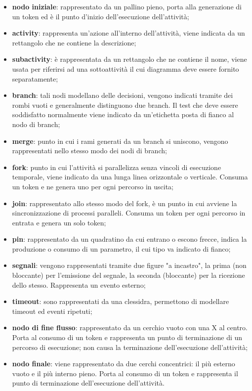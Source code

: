     	\begin{itemize}
    		\item{\textbf{nodo iniziale}}: rappresentato da un pallino pieno, porta alla generazione di un token ed è il punto d'inizio dell'esecuzione dell'attività;
    		\item{\textbf{activity}}: rappresenta un'azione all'interno dell'attività, viene indicata  da un rettangolo che ne contiene la descrizione;
    		\item{\textbf{subactivity}}: è rappresentata da un rettangolo che ne contiene il nome, viene usata per riferirsi ad una sottoattività il cui diagramma deve essere fornito separatamente;
    		\item{\textbf{branch}}: tali nodi modellano delle decisioni, vengono indicati tramite dei rombi vuoti e generalmente distinguono due branch. Il test che deve essere soddisfatto normalmente viene indicato da un'etichetta posta di fianco al nodo di branch;
    		\item{\textbf{merge}}: punto in cui i rami generati da un branch si uniscono, vengono rappresentati nello stesso modo dei nodi di branch;
    		\item{\textbf{fork}}: punto in cui l'attività si parallelizza senza vincoli di esecuzione temporale, viene indicato da una lunga linea orizzontale o verticale. Consuma un token e ne genera uno per ogni percorso in uscita;
    		\item{\textbf{join}}: rappresentato allo stesso modo del fork, è un punto in cui avviene la sincronizzazione di processi paralleli. Consuma un token per ogni percorso in entrata e genera un solo token;
    		\item{\textbf{pin}}: rappresentato da un quadratino da cui entrano o escono frecce, indica la produzione o consumo di un parametro, il cui tipo va indicato di fianco;
    		\item{\textbf{segnali}}: vengono rappresentati tramite due figure "a incastro", la prima (non bloccante) per l'emissione del segnale, la seconda (bloccante) per la ricezione dello stesso. Rappresenta un evento esterno;
    		\item{\textbf{timeout}}: sono rappresentati da una clessidra, permettono di modellare timeout ed eventi ripetuti;
    		\item{\textbf{nodo di fine flusso}}: rappresentato da un cerchio vuoto con una X al centro. Porta al consumo di un token e rappresenta un punto di terminazione di un percorso di esecuzione; non causa la terminazione dell'esecuzione dell'attività;
    		\item{\textbf{nodo finale}}: viene rappresentato da due cerchi concentrici: il più esterno vuoto e il più interno pieno. Porta al consumo di un token e rappresenta il punto di terminazione dell'esecuzione dell'attività.
    	\end{itemize}


